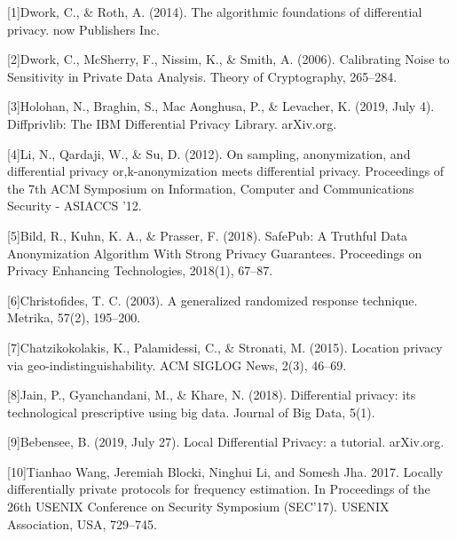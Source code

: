 \documentclass[inscr]{dithesis}
\begin{document}

[1]\hspace{1cm}Dwork, C., & Roth, A. (2014). The algorithmic foundations of differential privacy. now Publishers Inc. 

[2]\hspace{1cm}Dwork, C., McSherry, F., Nissim, K., & Smith, A. (2006). Calibrating Noise to Sensitivity in Private Data Analysis. Theory of Cryptography, 265–284. 

[3]\hspace{1cm}Holohan, N., Braghin, S., Mac Aonghusa, P., & Levacher, K. (2019, July 4). Diffprivlib: The IBM Differential Privacy Library. arXiv.org. 

[4]\hspace{1cm}Li, N., Qardaji, W., & Su, D. (2012). On sampling, anonymization, and differential privacy or,k-anonymization meets differential privacy. Proceedings of the 7th ACM Symposium on Information, Computer and Communications Security - ASIACCS '12. 

[5]\hspace{1cm}Bild, R., Kuhn, K. A., & Prasser, F. (2018). SafePub: A Truthful Data Anonymization Algorithm With Strong Privacy Guarantees. Proceedings on Privacy Enhancing Technologies, 2018(1), 67–87.

[6]\hspace{1cm}Christofides, T. C. (2003). A generalized randomized response technique. Metrika, 57(2), 195–200. 

[7]\hspace{1cm}Chatzikokolakis, K., Palamidessi, C., & Stronati, M. (2015). Location privacy via geo-indistinguishability. ACM SIGLOG News, 2(3), 46–69. 

[8]\hspace{1cm}Jain, P., Gyanchandani, M., & Khare, N. (2018). Differential privacy: its technological prescriptive using big data. Journal of Big Data, 5(1). 

[9]\hspace{1cm}Bebensee, B. (2019, July 27). Local Differential Privacy: a tutorial. arXiv.org. 

[10]\hspace{1cm}Tianhao Wang, Jeremiah Blocki, Ninghui Li, and Somesh Jha. 2017. Locally differentially private protocols for frequency estimation. In Proceedings of the 26th USENIX Conference on Security Symposium (SEC'17). USENIX Association, USA, 729–745.
\end{document}
